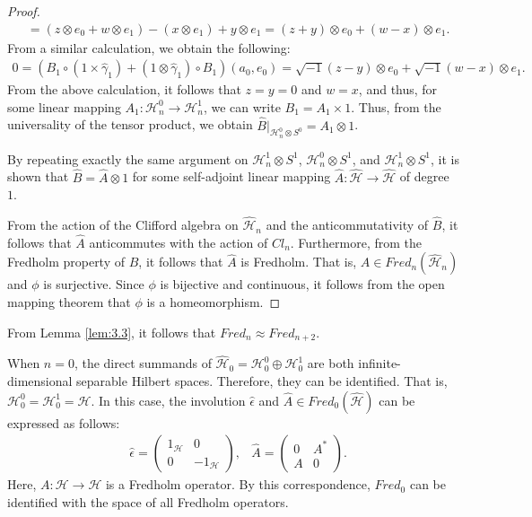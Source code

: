 \documentclass{amsart}
\theoremstyle{definition}
\theoremstyle{remark}
\begin{document}
\begin{proof}
\begin{align*}
&=(z\otimes e_0+w\otimes e_1)-(x\otimes e_1)+y\otimes e_1=(z+y)\otimes e_0+(w-x)\otimes e_1.
\end{align*}
From a similar calculation, we obtain the following:
\begin{align*}
0=(B_1 \circ (1\times \hat{\gamma}_1)+(1\otimes \hat{\gamma}_1) \circ B_1)(a_0, e_0)=
\sqrt{-1}(z-y)\otimes e_0+\sqrt{-1}(w-x)\otimes e_1.
\end{align*}
From the above calculation, it follows that \(z = y = 0\) and \(w = x\), and thus, for some linear mapping \(A_1 \colon \mathcal{H}_n^0 \to \mathcal{H}_n^1\), we can write \(B_1 = A_1 \times 1\). Thus, from the universality of the tensor product, we obtain \(\hat{B}|_{\mathcal{H}_n^0 \otimes S^0} = A_1 \otimes 1\).

By repeating exactly the same argument on \(\mathcal{H}_n^1 \otimes S^1\), \(\mathcal{H}_n^0 \otimes S^1\), and \(\mathcal{H}_n^1 \otimes S^1\), it is shown that \(\hat{B} = \hat{A} \otimes 1\) for some self-adjoint linear mapping \(\hat{A} \colon \hat{\mathcal{H}} \to \hat{\mathcal{H}}\) of degree \(1\).

From the action of the Clifford algebra on $\hat{\mathcal{H}}_n$ and the anticommutativity of \(\hat{B}\), it follows that \(\hat{A}\) anticommutes with the action of \(Cl_n\). Furthermore, from the Fredholm property of \(\hat{B}\), it follows that \(\hat{A}\) is Fredholm. That is, \(\hat{A} \in Fred_n(\hat{\mathcal{H}}_n)\) and $\phi$ is surjective. Since $\phi$ is bijective and continuous, it follows from the open mapping theorem that $\phi$ is a homeomorphism.
\end{proof}


From Lemma \ref{lem:3.3}, it follows that $Fred_{n} \approx Fred_{n+2}$.

When $n=0$, the direct summands of $\hat{\mathcal{H}}_0=\mathcal{H}_{0}^{0}\oplus \mathcal{H}_{0}^{1}$
are both infinite-dimensional separable Hilbert spaces. Therefore, they can be identified. That is, $\mathcal{H}_0^0=\mathcal{H}_0^1=\mathcal{H}$.
In this case, the involution $\hat{\epsilon}$ and $\hat{A} \in Fred_0(\hat{\mathcal{H}})$ can be expressed as follows:
\begin{align*}
&\hat{\epsilon}=
\begin{pmatrix}
1_{\mathcal{H}} & 0 \\
0 & -1_{\mathcal{H}}
\end{pmatrix},
&\hat{A}=
\begin{pmatrix}
0 & A^*\\
A & 0
\end{pmatrix}.
\end{align*}
Here, $A \colon \mathcal{H} \to \mathcal{H}$ is a Fredholm operator. By this correspondence, $Fred_{0}$ can be identified with the space of all Fredholm operators.
\end{document}
